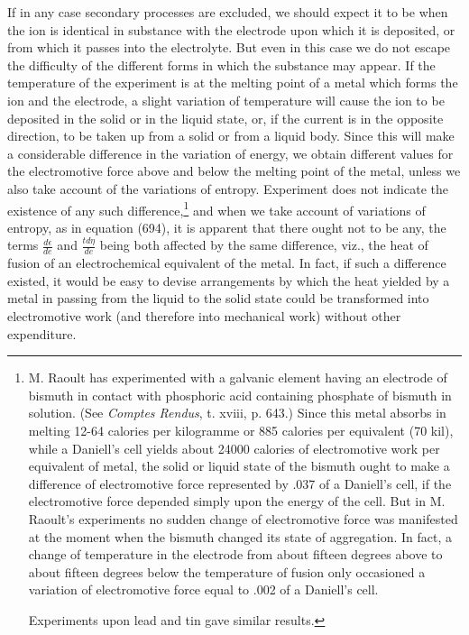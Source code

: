 \documentclass[12pt]{memoir}
\begin{document}
If in any case secondary processes are excluded, we should expect it to be when the ion is identical in substance with the electrode upon which it is deposited, or from which it passes into the electrolyte. But even in this case we do not escape the difficulty of the different forms in which the substance may appear. If the temperature of the experiment is at the melting point of a metal which forms the ion and the electrode, a slight variation of temperature will cause the ion to be deposited in the solid or in the liquid state, or, if the current is in the opposite direction, to be taken up from a solid or from a liquid body. Since this will make a considerable difference in the variation of energy, we obtain different values for the electromotive force above and below the melting point of the metal, unless we also take account of the variations of entropy. Experiment does not indicate the existence of any such difference,\footnote{M. Raoult has experimented with a galvanic element having an electrode of bismuth in contact with phosphoric acid containing phosphate of bismuth in solution. (See \textit{Comptes Rendus}, t. xviii, p. 643.) Since this metal absorbs in melting 12-64 calories per kilogramme or 885 calories per equivalent (70 kil), while a Daniell's cell yields about 24000 calories of electromotive work per equivalent of metal, the solid or liquid state of the bismuth ought to make a difference of electromotive force represented by .037 of a Daniell's cell, if the electromotive force depended simply upon the energy of the cell. But in M. Raoult's experiments no sudden change of electromotive force was manifested at the moment when the bismuth changed its state of aggregation. In fact, a change of temperature in the electrode from about fifteen degrees above to about fifteen degrees below the temperature of fusion only occasioned a variation of electromotive force equal to .002 of a Daniell's cell. \par
Experiments upon lead and tin gave similar results.} and when we take account of variations of entropy, as in equation (694), it is apparent that there ought not to be any, the terms $\frac{d\epsilon}{de}$ and $\frac{td\eta}{de}$ being both affected by the same difference, viz., the heat of fusion of an electrochemical equivalent of the metal. In fact, if such a difference existed, it would be easy to devise arrangements by which the heat yielded by a metal in passing from the liquid to the solid state could be transformed into electromotive work (and therefore into mechanical work) without other expenditure.
\end{document}
